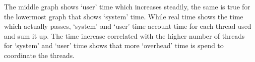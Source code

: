 \documentclass[a4paper,11pt,twoside]{article}
\begin{document}
The middle graph shows `user' time which increases steadily, the same
is true for the lowermost graph that shows `system' time. While real
time shows the time which actually passes, `system' and `user' time
account time for each thread used and sum it up. The time increase
correlated with the higher number of threads for `system' and `user'
time shows that more `overhead' time is spend to coordinate the threads.  



\end{document}
